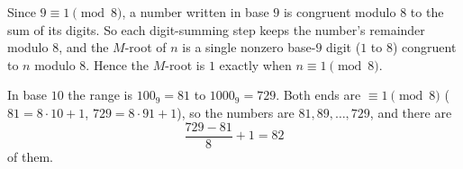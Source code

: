 Since $9\equiv1\pmod8$, a number written in base $9$ is congruent modulo $8$ to the sum of its digits. So each digit-summing step keeps the number's remainder modulo $8$, and the $M$-root of $n$ is a single nonzero base-$9$ digit ($1$ to $8$) congruent to $n$ modulo $8$. Hence the $M$-root is $1$ exactly when $n\equiv1\pmod8$.

In base $10$ the range is $100_9=81$ to $1000_9=729$. Both ends are $\equiv1\pmod8$ ($81=8\cdot10+1$, $729=8\cdot91+1$), so the numbers are $81,89,\dots,729$, and there are
\[\dfrac{729-81}{8}+1=\boxed{82}\]
of them.
